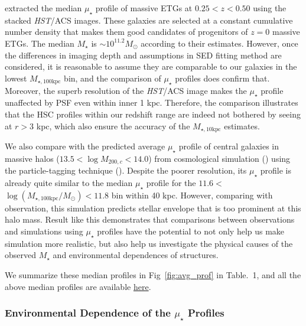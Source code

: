 \documentclass[a4paper,fleqn,usenatbib]{mnras}
\def\mstar{{$M_{\star}$}}
\def\minn{{$M_{\star,10\mathrm{kpc}}$}}
\def\mtot{{$M_{\star,100\mathrm{kpc}}$}}
\def\logmtot{{$\log (M_{\star,100\mathrm{kpc}}/M_{\odot})$}}
\def\mden{{$\mu_{\star}$}}
\begin{document}
    \citet{Patel2013} extracted the median \mden{} profile of massive ETGs at 
    $0.25 < z < 0.50$ using the stacked \textit{HST}/ACS images. 
    These galaxies are selected at a constant cumulative number density that makes them  
    good candidates of progenitors of $z=0$ massive ETGs.  
    The median \mstar{} is $\sim 10^{11.2} M_{\odot}$ according to their estimates.  
    However, once the differences in imaging depth and assumptions in SED fitting method
    are considered, it is reasonable to assume they are comparable to our galaxies in 
    the lowest \mtot{} bin, and the comparison of \mden{} profiles does confirm that.
    Moreover, the superb resolution of the \textit{HST}/ACS image makes the \mden{} 
    profile unaffected by PSF even within inner 1 kpc.
    Therefore, the comparison illustrates that the HSC profiles within our redshift
    range are indeed not bothered by seeing at $r > 3$ kpc, which also ensure the
    accuracy of the \minn{} estimates.
  
    We also compare with the predicted average \mden{} profile of central galaxies in 
    massive halos ($13.5 < \log M_{200,c} < 14.0$) from cosmological simulation
    (\citealt{Cooper13}) using the particle-tagging technique (\citealt{Cooper10}).
    Despite the poorer resolution, its \mden{} profile is already quite similar to 
    the median \mden{} profile for the $11.6 <$\logmtot{}$< 11.8$ bin within 40 kpc. 
    However, comparing with observation, this simulation predicts stellar envelope that
    is too prominent at this halo mass.
    Result like this demonstrates that comparisons between observations and simulations
    using \mden{} profiles have the potential to not only help us make simulation
    more realistic, but also help us investigate the physical causes of the observed
    \mstar{} and environmental dependences of structures.
    
    We summarize these median profiles in Fig~\ref{fig:avg_prof} in Table.~1,
    and all the above median profiles are available  
    \href{https://github.com/dr-guangtou/hsc_cenHighMh/tree/master/profiles}{here}.

\subsubsection{Environmental Dependence of the \mden{} Profiles}
    \label{sssec:sbp_mtot}    
    
\end{document}
